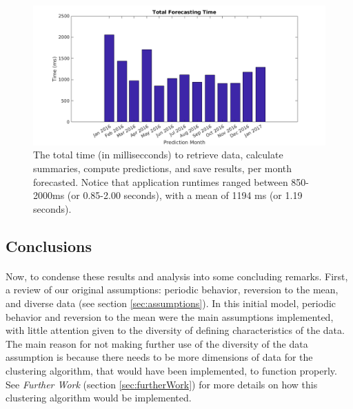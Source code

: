\documentclass[12pt,letterpaper,titlepage]{article}
\begin{document}
			\begin{figure}[!ht]
			\centering
				\includegraphics[scale=0.5]{total_time.png}
				\caption{The total time (in millisecconds) to retrieve data, calculate summaries, compute predictions, and save results, per month forecasted. Notice that application runtimes ranged between 850-2000ms (or 0.85-2.00 seconds), with a mean of 1194 ms (or 1.19 seconds).}
				\label{fig:total_time}
			\end{figure}
			\FloatBarrier
		
\newpage		
		\subsection{Conclusions}
		\paragraph*{}Now, to condense these results and analysis into some concluding remarks. First, a review of our original assumptions: periodic behavior, reversion to the mean, and diverse data (see section \ref{sec:assumptions}). In this initial model, periodic behavior and reversion to the mean were the main assumptions implemented, with little attention given to the diversity of defining characteristics of the data. The main reason for not making further use of the diversity of the data assumption is because there needs to be more dimensions of data for the clustering algorithm, that would have been implemented, to function properly. See \emph{Further Work} (section \ref{sec:furtherWork}) for more details on how this clustering algorithm would be implemented. 
\end{document}
